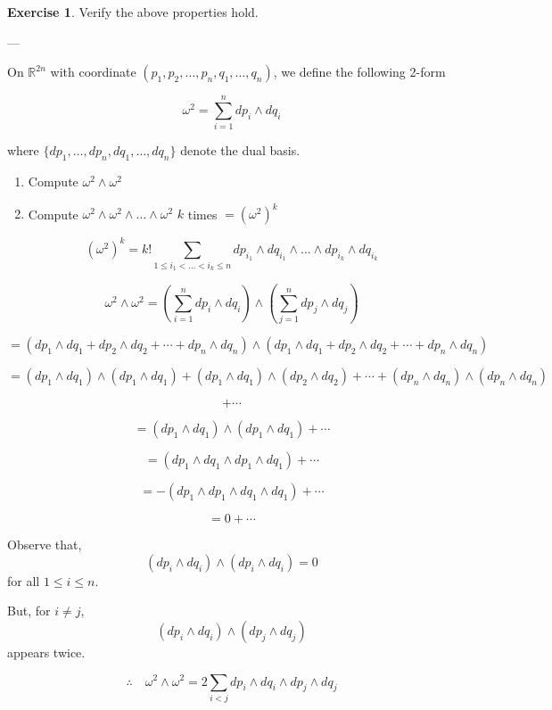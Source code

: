 \documentclass[11pt]{article}
\theoremstyle{definition}
\newtheorem{exercise}{Exercise}
\theoremstyle{remark}
\begin{document}
\begin{exercise}
Verify the above properties hold.
\end{exercise}

---

On $\mathbb{R}^{2n}$ with coordinate $(p_1, p_2, \dots, p_n, q_1, \dots, q_n)$, we define the following 2-form

\[
\omega^2 = \sum_{i=1}^n dp_i \wedge dq_i
\]

where $\{dp_1, \dots, dp_n, dq_1, \dots, dq_n\}$ denote the dual basis.

\begin{enumerate}
\item Compute $\omega^2 \wedge \omega^2$

\item Compute $\omega^2 \wedge \omega^2 \wedge \dots \wedge \omega^2$ $k$ times $= (\omega^2)^k$
\end{enumerate}

\[
(\omega^2)^k = k! \sum_{1 \leq i_1 < \dots < i_k \leq n} dp_{i_1} \wedge dq_{i_1} \wedge \dots \wedge dp_{i_k} \wedge dq_{i_k}
\]

\[
\omega^2 \wedge \omega^2 = \left( \sum_{i=1}^n dp_i \wedge dq_i \right) \wedge \left( \sum_{j=1}^n dp_j \wedge dq_j \right)
\]

\[
= (dp_1 \wedge dq_1 + dp_2 \wedge dq_2 + \cdots + dp_n \wedge dq_n) \wedge (dp_1 \wedge dq_1 + dp_2 \wedge dq_2 + \cdots + dp_n \wedge dq_n)
\]

\[
= (dp_1 \wedge dq_1) \wedge (dp_1 \wedge dq_1) + (dp_1 \wedge dq_1) \wedge (dp_2 \wedge dq_2) + \cdots + (dp_n \wedge dq_n) \wedge (dp_n \wedge dq_n)
\]

\[
+ \cdots
\]

\[
= (dp_1 \wedge dq_1) \wedge (dp_1 \wedge dq_1) + \cdots
\]

\[
= (dp_1 \wedge dq_1 \wedge dp_1 \wedge dq_1) + \cdots
\]

\[
= - (dp_1 \wedge dp_1 \wedge dq_1 \wedge dq_1) + \cdots
\]

\[
= 0 + \cdots
\]

Observe that,
\[
(dp_i \wedge dq_i) \wedge (dp_i \wedge dq_i) = 0
\]
for all \(1 \leq i \leq n\).

But, for \(i \neq j\),
\[
(dp_i \wedge dq_i) \wedge (dp_j \wedge dq_j)
\]
appears twice.

\[
\therefore \quad \omega^2 \wedge \omega^2 = 2 \sum_{i < j} dp_i \wedge dq_i \wedge dp_j \wedge dq_j
\]
\end{document}
